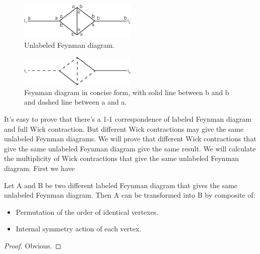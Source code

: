 \documentclass[12pt]{book}
\begin{document}
	\begin{figure}[htb]
		\centering  
		\includegraphics[width=0.5\textwidth]{resources/chap_feyn_diag/4_3_feyn_diag3.pdf}
		\caption{Unlabeled Feynman diagram.}
		\label{fig:unlabeled_feyn3} 
	\end{figure}
	
	\begin{figure}[htb]
		\centering  
		\includegraphics[width=0.5\textwidth]{resources/chap_feyn_diag/4_3_feyn_diag4.pdf}
		\caption{Feynman diagram in concise form, with solid line between b and b and dashed line between a and a.}
		\label{fig:unlabeled_feyn4} 
	\end{figure}
	
	It's easy to prove that there's a 1-1 correspondence of labeled Feynman diagram and full Wick contraction. But different Wick contractions may give the same unlabeled Feynman diagrams. We will prove that different Wick contractions that give the same unlabeled Feynman diagram give the same result. We will calculate the multiplicity of Wick contractions that give the same unlabeled Feynman diagram. First we have
	\begin{theorem}
		Let A and B be two different labeled Feynman diagram that gives the same unlabeled Feynman diagram. Then A can be transformed into B by composite of:
		\begin{itemize}
			\item Permutation of the order of identical vertexes.
			\item Internal symmetry action of each vertex.
		\end{itemize} 
	\end{theorem}
	\begin{proof}
		Obvious.
	\end{proof}
	
\end{document}

